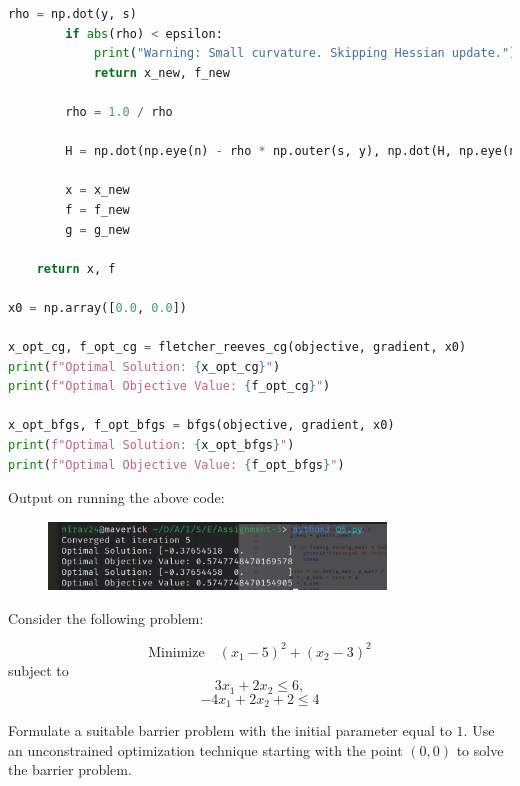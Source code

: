 \documentclass{article}
\begin{document}
\begin{lstlisting}[language=Python]
        rho = np.dot(y, s)
        if abs(rho) < epsilon:
            print("Warning: Small curvature. Skipping Hessian update.")
            return x_new, f_new

        rho = 1.0 / rho 

        H = np.dot(np.eye(n) - rho * np.outer(s, y), np.dot(H, np.eye(n) - rho * np.outer(y, s))) + rho * np.outer(s, s)
        
        x = x_new
        f = f_new
        g = g_new
    
    return x, f  

x0 = np.array([0.0, 0.0])

x_opt_cg, f_opt_cg = fletcher_reeves_cg(objective, gradient, x0)
print(f"Optimal Solution: {x_opt_cg}")
print(f"Optimal Objective Value: {f_opt_cg}")

x_opt_bfgs, f_opt_bfgs = bfgs(objective, gradient, x0)
print(f"Optimal Solution: {x_opt_bfgs}")
print(f"Optimal Objective Value: {f_opt_bfgs}")
\end{lstlisting}

Output on running the above code:

\begin{figure}[H]
    \centering
    \includegraphics[width=0.8\textwidth]{Images/Q5.png}
\end{figure}


\begin{question*}[6]
    Consider the following problem:

    \[
    \text{Minimize} \quad (x_1 - 5)^2 + (x_2 - 3)^2
    \]
    subject to 
    \[
    3x_1 + 2x_2 \leq 6,
    \]
    \[
    -4x_1 + 2x_2 + 2 \leq 4
    \]

    Formulate a suitable barrier problem with the initial parameter equal to $1$. Use an unconstrained optimization technique starting with the point \( (0, 0) \) to solve the barrier problem.
\end{question*}
\end{document}
